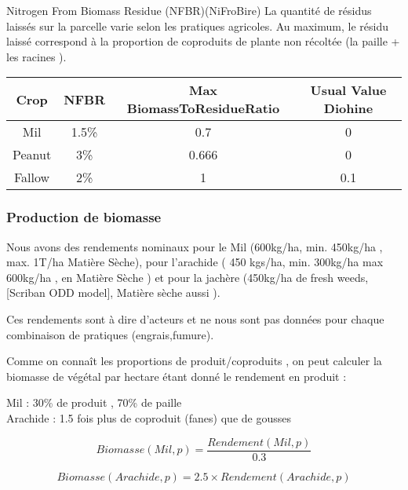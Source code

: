 \documentclass[10pt,a4paper,french]{article} %
\begin{document}
Nitrogen From Biomass Residue (NFBR)(NiFroBire)
La quantité de résidus laissés sur la parcelle varie selon les pratiques agricoles.
Au maximum, le résidu laissé correspond à la proportion de coproduits de  plante non récoltée (la paille + les racines ).



\begin{table}[h!]
\begin{tabular}{|c|c|c|c|}
\hline
\textbf{Crop}          & \textbf{NFBR}    & \textbf{Max BiomassToResidueRatio} & \textbf{Usual Value Diohine}  \\ \hline
Mil                    & 1.5\%                 & 0.7                                  &  0 \\ \hline
Peanut                 & 3\%                   & 0.666                               &  0 \\ \hline
Fallow                 & 2\%                   & 1                                   &  0.1 \\\hline
\end{tabular}
\end{table}




\subsubsection{Production de biomasse}


Nous avons des rendements nominaux pour le Mil (600kg/ha, min. 450kg/ha , max. 1T/ha Matière Sèche), pour l'arachide ( 450 kgs/ha, min. 300kg/ha max 600kg/ha , en Matière Sèche ) et pour la jachère (450kg/ha de fresh weeds, [Scriban ODD model], Matière sèche aussi  ).

Ces rendements sont à dire d'acteurs et ne nous sont pas données pour chaque combinaison de pratiques (engrais,fumure).

Comme on connaît les proportions de  produit/coproduits , on peut calculer la biomasse de végétal par hectare étant donné le rendement en produit : 

Mil : 30\% de produit ,  70\% de paille \\
Arachide : 1.5 fois plus de coproduit (fanes) que de gousses

\begin{equation}
Biomasse(Mil,p) =  \frac{Rendement(Mil,p)}{0.3}
\end{equation}

\begin{equation}
Biomasse(Arachide,p) =  2.5 \times Rendement(Arachide,p)
\end{equation}\\
\end{document}
